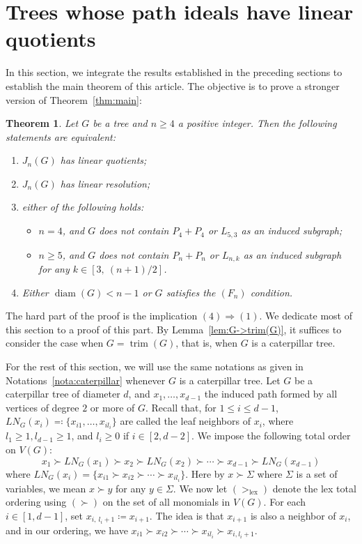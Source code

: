 \documentclass{amsart}
\newtheorem{theorem}{Theorem}[section]
\theoremstyle{remark}
\theoremstyle{definition}
\DeclareMathOperator{\lex}{lex}
\DeclareMathOperator{\diam}{diam}
\DeclareMathOperator{\trim}{trim}
\begin{document}
    
	\section{Trees whose path ideals have linear quotients}\label{sec:main}

    In this section, we integrate the results established in the preceding sections to establish the main theorem of this article. The objective is to prove a stronger version of Theorem~\ref{thm:main}:
	
    \begin{theorem}\label{thm:main-section-5}
		Let $G$ be a tree and $n\geq 4$ a positive integer. Then the following statements are equivalent:
        \begin{enumerate}
            \item $J_n(G)$ has linear quotients;
            \item $J_n(G)$ has linear resolution;
            \item either of the following holds:
            \begin{itemize}
                \item[(i)] $n=4$, and  $G$ does not contain $P_4+P_4$ or $L_{5,3}$ as an induced subgraph;
                \item[(ii)] $n\geq 5$, and $G$ does not contain $P_n+P_n$ or $L_{n,k}$ as an induced subgraph for  any $k\in [3,\ (n+1)/2]$.
            \end{itemize}
            \item Either $\diam(G)<n-1$ or $G$ satisfies the $(F_n)$ condition.
        \end{enumerate}
	\end{theorem}
    
    The hard part of the proof is the implication $(4)\Rightarrow (1)$. We dedicate most of this section to a proof of this part. By Lemma~\ref{lem:G->trim(G)}, it suffices to consider the case when $G=\trim(G)$, that is, when $G$ is a caterpillar tree.
    
    For the rest of this section, we will use the same notations as given in Notations~\ref{nota:caterpillar} whenever $G$ is a caterpillar tree.     Let $G$ be a caterpillar tree of diameter $d$, and $x_1,\dots, x_{d-1}$ the induced path formed by all vertices of degree $2$ or more of $G$. Recall that, for $1\leq i\leq d-1$, $LN_G(x_i)\eqqcolon\{x_{i1},\dots, x_{il_i}\}$ are called the leaf neighbors of $x_i$,  where $l_1\geq 1, l_{d-1}\geq 1$, and $l_i\geq 0$ if $i\in[2,d-2]$. We impose the following total order on $V(G)$:
		\[
		x_1\succ LN_G(x_1)\succ x_2\succ LN_G(x_2) \succ \cdots \succ  x_{d-1}\succ LN_G(x_{d-1})
		\]
		where $LN_G(x_i)=\{x_{i1}\succ x_{i2}\succ\cdots \succ x_{il_i}\}$. Here by $x\succ \Sigma$ where $\Sigma$ is a set of variables, we mean $x\succ y$ for any $y\in \Sigma$. We now let $(>_{\lex})$ denote the lex total ordering using $(\succ)$ on the set of all monomials in $V(G)$. For each $i\in [1,d-1]$, set $x_{i, \ l_i+1}\coloneqq x_{i+1}$. The idea is that $x_{i+1}$ is also a neighbor of $x_i$, and in our ordering, we have $x_{i1}\succ x_{i2}\succ \cdots \succ x_{i l_i} \succ x_{i, l_i+1}$. 
		
\end{document}
